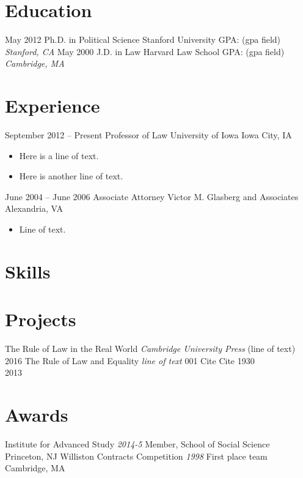 \documentclass[letterpaper]{moderncv}
\begin{document}
\makecvtitle
\section{Education}
\cventry
{May 2012}
{Ph.D. in Political Science}
{Stanford University}
{GPA: (gpa field)}
{\textit{Stanford, CA}}
{}
\cventry
{May 2000}
{J.D. in Law}
{Harvard Law School}
{GPA: (gpa field)}
{\textit{Cambridge, MA}}
{}
\section{Experience}
\cventry
{September 2012 -- Present}
{Professor of Law}
{University of Iowa}
{Iowa City, IA}
{}
{\begin{itemize}%
	\item Here is a line of text.
	\item Here is another line of text.
	\end{itemize}}
\cventry
{June 2004 -- June 2006}
{Associate Attorney}
{Victor M. Glasberg and Associates}
{Alexandria, VA}
{}
{\begin{itemize}%
	\item Line of text.
	\end{itemize}}
\section{Skills}
\section{Projects}
\cventry
{}
{The Rule of Law in the Real World}
{}
{\textit{Cambridge University Press}}
{}
{(line of text)\\2016}
\vspace{1mm}
\cventry
{}
{The Rule of Law and Equality}
{}
{\textit{line of text}}
{}
{001 Cite Cite 1930\\2013}
\vspace{1mm}
\section{Awards}
\cventry
{}
{Institute for Advanced Study}
{}
{\textit{2014-5}}
{}
{Member, School of Social Science\\Princeton, NJ}
\vspace{1mm}
\cventry
{}
{Williston Contracts Competition}
{}
{\textit{1998}}
{}
{First place team\\Cambridge, MA}
\vspace{1mm}
\ 
\end{document}
